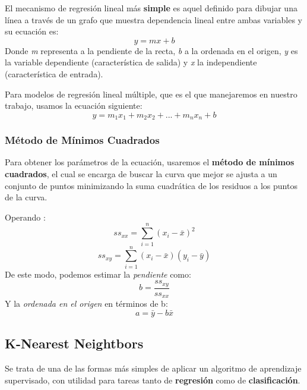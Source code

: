 El mecanismo de regresión lineal más \textbf{simple} es aquel definido para dibujar una línea a través de un grafo que muestra dependencia lineal entre ambas variables y su ecuación es\cite{Belyadi2021SupervisedLearning}:
\begin{equation}
    y=mx+b
\end{equation}
Donde \textit{m} representa a la pendiente de la recta, \textit{b} a la ordenada en el origen, \textit{y} es la variable dependiente (característica de salida) y \textit{x} la independiente (característica de entrada).

Para modelos de regresión lineal múltiple, que es el que manejaremos en nuestro trabajo, usamos la ecuación siguiente\cite{Belyadi2021SupervisedLearning}: 
\begin{equation}
    y = m_{1} x_{1} + m_{2} x_{2} + ... + m_{n}x_{n} + b
\end{equation}
\subsubsection{Método de Mínimos Cuadrados}
Para obtener los parámetros de la ecuación, usaremos el \textbf{método de mínimos cuadrados}, el cual se encarga de buscar la curva que mejor se ajusta a un conjunto de puntos minimizando la suma cuadrática de los residuos a los puntos de la curva\cite{WeissteinLeastFitting}.

Operando \cite{WeissteinLeastFitting}:
\begin{equation}
    ss_{xx} = \sum_{i=1}^{n}(x_{i}-\bar{x})^2
\end{equation}
\begin{equation}
        ss_{xy} = \sum_{i=1}^{n}(x_{i}-\bar{x})(y_{i}-\bar{y})
\end{equation}
De este modo, podemos estimar la \textit{pendiente} como:
\begin{equation}
    b = \frac{ss_{xy}}{ss_{xx}}
\end{equation}
Y la \textit{ordenada en el origen} en términos de b:
\begin{equation}
    a = \bar{y}-b\bar{x}
\end{equation}

\subsection{K-Nearest Neightbors}

Se trata de una de las formas más simples de aplicar un algoritmo de aprendizaje supervisado, con utilidad para tareas tanto de \textbf{regresión} como de \textbf{clasificación}.

